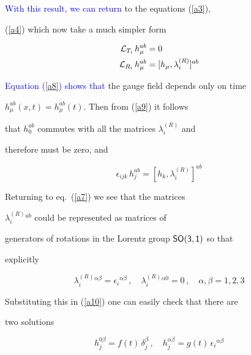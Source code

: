 \documentclass [prd,reprint,eqsecnum,nofootinbib]  {revtex4-1}
\newcommand{\corr}[1]{\textcolor{blue}{#1}}
\begin{document}
\corr{With this result, we can return} to the equations (\ref{a3}),

(\ref{a4}) which now take a much simpler form

\begin{align}

    {\cal L}_{T_i}\,h_\mu^{ab} &= 0\label{a8}\\  {\cal L}_{R_i}\,h_\mu^{ab} &=  [h_\mu,\lambda^{(R)}_i]^{ab}\label{a9}

\end{align}

\corr{Equation (\ref{a8}) shows that} the gauge field depends only on time

$h_\mu^{ab}(x,t) = h_\mu^{ab}(t)$. Then from (\ref{a9}) it follows

that $h_0^{ab}$ commutes with all the matrices $\lambda^{(R)}_i$ and

therefore must be zero, and

\begin{equation}\label{a10}

\epsilon_{ijk}\, h_j^{ab}=[h_k,\lambda^{(R)}_i]^{ab}

\end{equation}

Returning to eq.\ (\ref{a7}) we see that the matrices

$\lambda^{(R)}_i{}^{ab}$ could be represented as matrices of

generators of rotations in the Lorentz group $\sf{SO(3,1)}$ so that

explicitly

\begin{equation}\label{a11}

\lambda^{(R)}_i{}^{\alpha\beta} = \epsilon_i{}^{\alpha\beta}\,,

\quad\lambda^{(R)}_i{}^{\alpha0} =0\,, \quad \alpha,\beta=1,2,3

\end{equation}

Substituting this in (\ref{a10}) one can easily check that there are

two solutions

\begin{equation}\label{a12}

h_j^{0\beta} =f(t) \, \delta_j^\beta\,, \quad h_j^{\alpha\beta} =

g(t)\, \epsilon_i{}^{\alpha\beta}

\end{equation}
\end{document}
